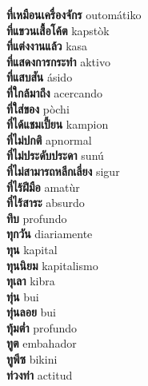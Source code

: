 \textbf{ ที่เหมือนเครื่องจักร  } outomátiko \\
\textbf{ ที่แขวนเสื้อโค้ต  } kapstòk \\
\textbf{ ที่แต่งงานแล้ว  } kasa \\
\textbf{ ที่แสดงการกระทำ  } aktivo \\
\textbf{ ที่แสบสัน  } ásido \\
\textbf{ ที่ใกล้มาถึง  } acercando \\
\textbf{ ที่ใส่ของ  } pòchi \\
\textbf{ ที่ได้แชมเปี้ยน  } kampion \\
\textbf{ ที่ไม่ปกติ  } apnormal \\
\textbf{ ที่ไม่ประดับประดา  } sunú \\
\textbf{ ที่ไม่สามารถหลีกเลี่ยง  } sigur \\
\textbf{ ที่ไร้ฝีมือ  } amatùr \\
\textbf{ ที่ไร้สาระ  } absurdo \\
\textbf{ ทึบ  } profundo \\
\textbf{ ทุกวัน  } diariamente \\
\textbf{ ทุน  } kapital \\
\textbf{ ทุนนิยม  } kapitalismo \\
\textbf{ ทุเลา  } kibra \\
\textbf{ ทุ่น  } bui \\
\textbf{ ทุ่นลอย  } bui \\
\textbf{ ทุ้มต่ำ  } profundo \\
\textbf{ ทูต  } embahador \\
\textbf{ ทูพีซ  } bikini \\
\textbf{ ท่วงท่า  } actitud \\
